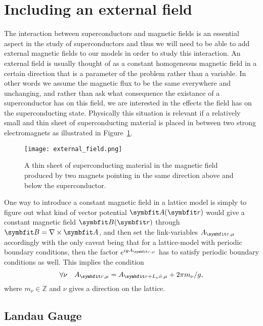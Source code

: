 \section{Including an external field}
\label{sec:LM:Field}

The interaction between superconductors and magnetic fields is an essential aspect in the study of superconductors and thus we will need to be able to add external magnetic fields
to our models in order to study this interaction. An external field is usually thought of as a constant homogeneous magnetic field in a certain direction that is a parameter of
the problem rather than a variable. In other words we assume the magnetic flux to be the same everywhere and unchanging, and rather than ask what consequence the existance of a superconductor
has on this field, we are interested in the effects the field has on the superconducting state. Physically this situation is relevant \eg if a relatively small and thin sheet
of superconducting material is placed in between two strong electromagnets as illustrated in Figure~\ref{fig:LM:Field:externalField}.
\begin{figure}[t]
    \centering
    \texttt{[image: external\_field.png]}
    \caption{A thin sheet of superconducting material in the magnetic field produced by two magnets pointing in the same direction above and below the superconductor.}
    \label{fig:LM:Field:externalField}
\end{figure}

One way to introduce a constant magnetic field in a lattice model is simply to figure out what kind of vector potential $\v{A}(\v{r})$ would give a constant magnetic field $\v{B}(\v{r})$
through $\v{B} = \nabla\times\v{A}$, and then set the link-variables $A_{\v{r},\mu}$ accordingly with the only caveat being that for a lattice-model with periodic boundary conditions,
then the factor $e^{igA_{\v{r},\mu}}$ has to satisfy periodic boundary conditions as well. This implies the condition
\begin{equation}
    \label{eq:LM:Field:periodicBC}
    \forall\nu\quad A_{\v{r},\mu} = A_{\v{r}+L_\nu\hat{\nu},\mu} + 2\pi m_\nu/g,
\end{equation}
where $m_\nu\in\mathbb{Z}$ and $\nu$ gives a direction on the lattice.

\subsection{Landau Gauge}
\label{sec:LM:Field:LandauGauge}

